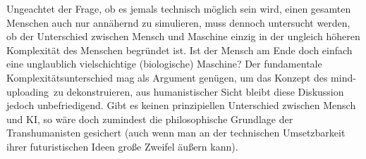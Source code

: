 \documentclass[12pt]{article}
\begin{document}
Ungeachtet der Frage, ob es jemals technisch möglich sein wird, einen gesamten Menschen auch nur annähernd zu simulieren, muss dennoch
untersucht werden, ob der Unterschied zwischen Mensch und Maschine einzig in der ungleich höheren Komplexität des Menschen begründet ist.
Ist der Mensch am Ende doch einfach eine unglaublich vielschichtige (biologische) Maschine?
Der fundamentale Komplexitätsunterschied mag als Argument genügen, um das Konzept des \glqq mind-uploading\grqq\ zu dekonstruieren,
aus humanistischer Sicht bleibt diese Diskussion jedoch unbefriedigend. Gibt es keinen prinzipiellen Unterschied zwischen Mensch und KI,
so wäre doch zumindest die philosophische Grundlage der Transhumanisten gesichert (auch wenn man an der technischen Umsetzbarkeit ihrer 
futuristischen Ideen große Zweifel äußern kann).

\begin{comment}
Beschäftigt man sich genauer mit KI, Simulation oder Robotern, so fällt auf, dass alle menschenähnlichen bzw. humanoiden Konzepte stets
unabhängig von der Hardware sind. Computerprogramme und Daten können einfach auf anderen Speicherplatten abgelegt werden,
Roboter sind völlig austauschbar, es spielt keine Rolle welche Metallteile genau verwendet werden, da alle verwendeten Teile
auf der relevanten Skala im Wesentlichen gleich sind. Diese Austauschbarkeit ist z.B. wesentlich dafür, dass Algorithmen/Roboter keinen Prozess kennen,
der dem Tod bei Menschen ähnelt. Damit macht sie auch für einige Tech-Enthusiasten den Reiz dieser Technologien aus - der Traum von der Unsterblichkeit ist
so alt wie die Menschheit selber, bereits das Buch Kohelet kennt diese Sehnsucht: 
"Auch hat er [Gott] die Ewigkeit in ihr [der Menschen] Herz gelegt; nur dass der Mensch nicht ergründen kann das Werk, das Gott tut, weder Anfang noch Ende." 
(Kohelet 3,11). Im Gegensatz zum Prediger kommen viele Transhumanisten sehr wohl zu der Überzeugung, das Werk Gottes ergründen zu können
und versuchen sich daran, die Ewigkeit durch Mind-Uploading auf eigene Faust zu erlangen.
Die Unsterblichkeit macht aber die tatsächliche Simulation des Menschen unmöglich, da das Sterben ein wesentlicher Bestandteil des Menschseins ist.
Gefühle wie Angst o.ä. setzen die Sterblichkeit als notwendige Bedingung voraus. Allein schon Hunger oder Durst ergeben nur dann Sinn,
wenn es tatsächlich eine Art Sterblichkeit gibt.

Tatsächlich gibt uns aber genau dieser Sachverhalt noch ein zweites Argument an die Hand, um zu zeigen, 
dass Menschen sich grundsätzlich von Algorithmen/Robotern unterscheiden. Für Menschen ist es nicht egal, 
in welchem Körper sie sich befinden, bzw. tatsächlich ergibt allein schon der vorausgehende Satz nicht wirklich viel Sinn, da ein Mensch sich
nicht in einem Körper befindet, sondern der Körper wesentlich für den Menschen ist. Ein Mensch ist nicht in einem Körper, sondern in einem gewissen Sinne
ist der Mensch sein Körper. Natürlich ist noch nicht ausgeschlossen, dass der Mensch noch mehr ist als nur sein Körper, aber man kann zumindest
einen Menschen nicht von seinem Körper trennen. Die Lebendigkeit, der Geist des Menschen, alles was den Mensch als Mensch auszeichnet ist eben gerade 
nicht als abstrakte Information übertragbar, sondern ist an die Körperlichkeit gekoppelt.


\end{comment}
\end{document}
